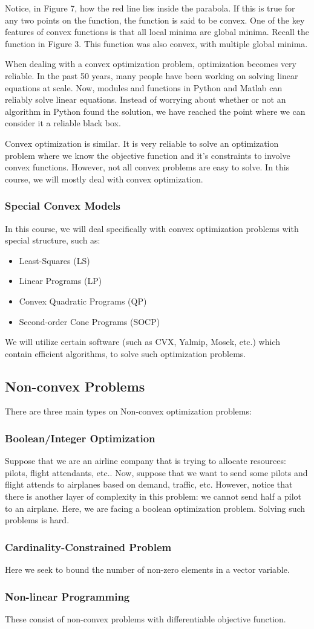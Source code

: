 \documentclass[12pt]{article}
\begin{document}
\noindent Notice, in Figure 7, how the red line lies inside the parabola. If this is true for any two points on the function, the function is said to be convex. One of the key features of convex functions is that all local minima are global minima. Recall the function in Figure 3. This function was also convex, with multiple global minima.

\noindent When dealing with a convex optimization problem, optimization becomes very reliable. In the past 50 years, many people have been working on solving linear equations at scale. Now, modules and functions in Python and Matlab can reliably solve linear equations. Instead of worrying about whether or not an algorithm in Python found the solution, we have reached the point where we can consider it a reliable black box. 

\noindent Convex optimization is similar. It is very reliable to solve an optimization problem where we know the objective function and it's constraints to involve convex functions. However, not all convex problems are easy to solve. In this course, we will mostly deal with convex optimization.

\subsubsection{Special Convex Models}
In this course, we will deal specifically with convex optimization problems with special structure, such as:
\begin{itemize}
\item Least-Squares (LS)
\item Linear Programs (LP)
\item Convex Quadratic Programs (QP)
\item Second-order Cone Programs (SOCP)
\end{itemize}
We will utilize certain software (such as CVX, Yalmip, Mosek, etc.) which contain efficient algorithms, to solve such optimization problems.
\subsection{Non-convex Problems}
There are three main types on Non-convex optimization problems:
\subsubsection{Boolean/Integer Optimization}
Suppose that we are an airline company that is trying to allocate resources: pilots, flight attendants, etc.. Now, suppose that we want to send some pilots and flight attends to airplanes based on demand, traffic, etc. However, notice that there is another layer of complexity in this problem: we cannot send half a pilot to an airplane. Here, we are facing a boolean optimization problem. Solving such problems is hard. 
\subsubsection{Cardinality-Constrained Problem}
Here we seek to bound the number of non-zero elements in a vector variable.
\subsubsection{Non-linear Programming}
These consist of non-convex problems with differentiable objective function. 

\nocite{*}


\end{document}
